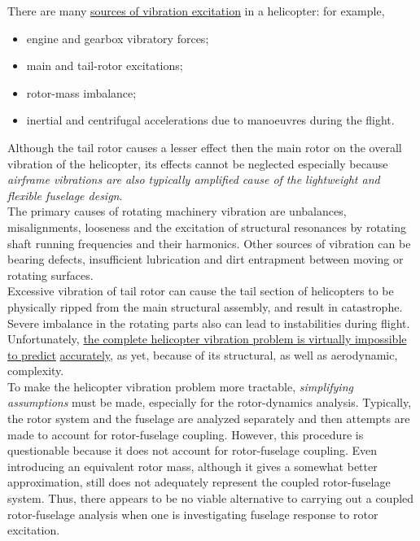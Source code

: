 \noindent
There are many \underline{sources of vibration excitation} in a helicopter: for example,
\begin{itemize}
	\item engine and gearbox vibratory forces;
	\item main and tail-rotor excitations;
	\item rotor-mass imbalance;
	\item inertial and centrifugal accelerations due to manoeuvres during the flight. 
\end{itemize}

\bigskip
\noindent
Although the tail rotor causes a lesser effect then the main rotor on the overall vibration of the helicopter, its effects cannot be neglected especially because \emph{airframe vibrations are also typically amplified cause of the lightweight and flexible fuselage design}. \\
The primary causes of rotating machinery vibration are unbalances, misalignments, looseness and the excitation of structural resonances by rotating shaft running frequencies and their harmonics. Other sources of vibration can be bearing defects, insufficient lubrication and dirt entrapment between moving or rotating surfaces. \\
Excessive vibration of tail rotor can cause the tail section of helicopters to be physically ripped from the main structural assembly, and result in catastrophe. Severe imbalance in the rotating parts also can lead to instabilities during flight. \\

\noindent
Unfortunately, \underline{the complete helicopter vibration problem is virtually impossible to predict} \underline{accurately}, as yet, because of its structural, as well as aerodynamic, complexity. \\
To make the helicopter vibration problem more tractable, \emph{simplifying assumptions} must be made, especially for the rotor-dynamics analysis. Typically, the rotor system and the fuselage are analyzed separately and then attempts are made to account for rotor-fuselage coupling.
However, this procedure is questionable because it does not account for rotor-fuselage coupling. 
Even introducing an equivalent rotor mass, although it gives a somewhat better approximation, still does not adequately represent the coupled rotor-fuselage system. Thus, there appears to be no viable alternative to carrying out a coupled rotor-fuselage analysis when one is investigating fuselage response to rotor excitation. \\

